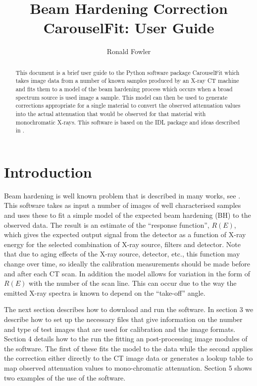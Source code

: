 \documentclass[a4paper]{article}
\begin{document}
\title{Beam Hardening Correction CarouselFit: User Guide}
\author{Ronald Fowler}

\maketitle

\begin{abstract}
This document is a brief user guide to the Python software package CarouselFit which takes image
data from a number of known samples produced by an X-ray CT machine and fits them to a model of
the beam hardening process which occurs when a broad spectrum source is used image a sample.
This model can then be used to generate corrections appropriate for a single material to convert
the observed attenuation values into the actual attenuation that would be observed for that material
with monochromatic X-rays.
This software is based on the IDL package and ideas described in \cite{davis}.
\end{abstract}

\section{Introduction}
Beam hardening is well known problem that is described in many works, see \cite{davis}.
This software takes as input a number of images of well characterised samples and uses these
to fit a simple model of the expected beam hardening (BH) to the observed data.
The result is an estimate of the ``response function'', $R(E)$, which gives the expected output signal
from the detector as a function of X-ray energy for the selected combination of X-ray source, filters
and detector.
Note that due to aging effects of the X-ray source, detector, etc., this function may change over time,
so ideally the calibration measurements should be made before and after each CT scan.
In addition the model allows for variation in the form of $R(E)$ with the number of the scan line.
This can occur due to the way the emitted X-ray spectra is known to depend on the ``take-off'' angle.

The next section describes how to download and run the software.
In section 3 we describe how to set up the necessary files that give
information on the number and type of test images that are used for calibration and the
image formats.
Section 4 details how to the run the fitting an post-processing image modules of the software.
The first of these fits the model to the data while the second applies the correction either
directly to the CT image data or generates a lookup table to map observed attenuation values to
mono-chromatic attenuation.
Section 5 shows two examples of the use of the software.
\end{document}
